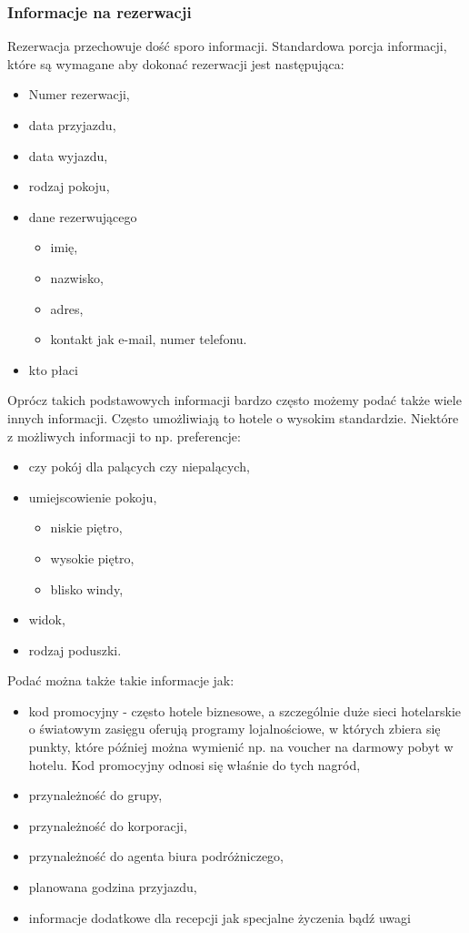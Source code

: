 \documentclass[a4paper,onecolumn,oneside,11pt,wide,floatssmall]{mwrep}
\theoremstyle{definition}
\theoremstyle{plain}%
\theoremstyle{remark}
\begin{document}
\subsubsection{Informacje na rezerwacji}
\label{informacje_na_rezerwacji}
Rezerwacja przechowuje dość sporo informacji. Standardowa porcja informacji, 
które są wymagane aby dokonać rezerwacji jest następująca:
\begin{itemize}
  \item Numer rezerwacji,
  \item data przyjazdu,
  \item data wyjazdu,
  \item rodzaj pokoju,
  \item dane rezerwującego
  \begin{itemize}
    \item imię,
    \item nazwisko, 
    \item adres, 
    \item kontakt jak e-mail, numer telefonu.
  \end{itemize} 
  \item kto płaci
\end{itemize}

Oprócz takich podstawowych informacji bardzo często możemy podać także wiele 
innych informacji. Często umożliwiają to hotele o wysokim standardzie. Niektóre
z możliwych informacji to np. preferencje:
\begin{itemize}
  \item czy pokój dla palących czy niepalących,
  \item umiejscowienie pokoju,
  \begin{itemize}
    \item niskie piętro,
    \item wysokie piętro,
    \item blisko windy,
  \end{itemize}
  \item widok,
  \item rodzaj poduszki.
\end{itemize}

Podać można także takie informacje jak:
\begin{itemize}
  \item kod promocyjny - często hotele biznesowe, a szczególnie duże sieci
  hotelarskie o światowym zasięgu oferują programy lojalnościowe, w których
  zbiera się punkty, które później można wymienić np. na voucher na darmowy
  pobyt w hotelu. Kod promocyjny odnosi się właśnie do tych nagród,
  \item przynależność do grupy,
  \item przynależność do korporacji,
  \item przynależność do agenta biura podróżniczego,
  \item planowana godzina przyjazdu,
  \item informacje dodatkowe dla recepcji jak specjalne życzenia bądź uwagi
\end{itemize}
\end{document}
